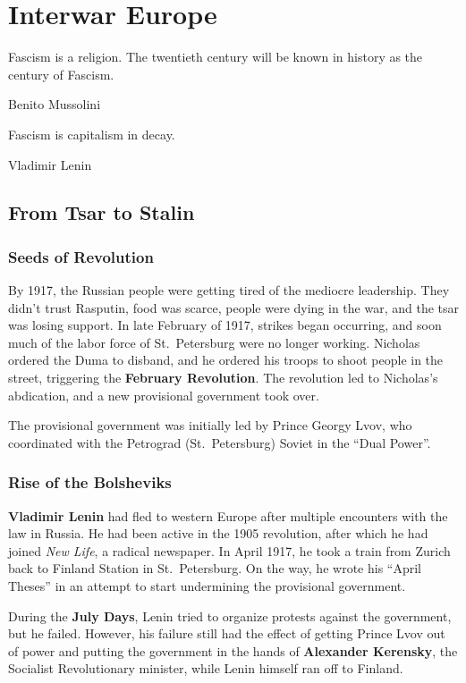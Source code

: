 \chapter{Interwar Europe}

\epigraph{%
  Fascism is a religion. The twentieth century will be known in history as the century of Fascism.
}{Benito Mussolini}

\epigraph{%
  Fascism is capitalism in decay.
}{Vladimir Lenin}

\section{From Tsar to Stalin}

\subsection*{Seeds of Revolution}

By 1917, the Russian people were getting tired of the mediocre leadership.
They didn't trust Rasputin, food was scarce, people were dying in the war, and the tsar was losing support.
In late February of 1917, strikes began occurring,
and soon much of the labor force of St.\ Petersburg were no longer working.
Nicholas ordered the Duma to disband, and he ordered his troops to shoot people in the street,
triggering the \textbf{February Revolution}.
The revolution led to Nicholas's abdication, and a new provisional government took over.

The provisional government was initially led by Prince Georgy Lvov,
who coordinated with the Petrograd (St.\ Petersburg) Soviet in the ``Dual Power''.

\subsection*{Rise of the Bolsheviks}

\textbf{Vladimir Lenin} had fled to western Europe after multiple encounters with the law in Russia.
He had been active in the 1905 revolution, after which he had joined \textit{New Life}, a radical newspaper.
In April 1917, he took a train from Zurich back to Finland Station in St.\ Petersburg.
On the way, he wrote his ``April Theses'' in an attempt to start undermining the provisional government.

During the \textbf{July Days}, Lenin tried to organize protests against the government, but he failed.
However, his failure still had the effect of getting Prince Lvov out of power
and putting the government in the hands of \textbf{Alexander Kerensky},
the Socialist Revolutionary minister,
while Lenin himself ran off to Finland.

